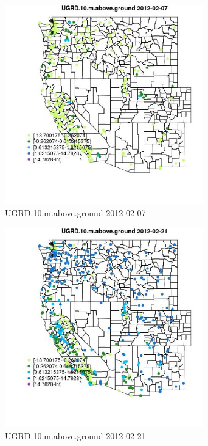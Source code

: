 \begin{figure} 
\centering  
\includegraphics[width=0.77\textwidth]{Code_Outputs/Report_ML_input_PM25_Step4_part_f_de_duplicated_aveswNAs_MapObsUGRD10maboveground2012-02-07.jpg} 
\caption{\label{fig:Report_ML_input_PM25_Step4_part_f_de_duplicated_aveswNAsMapObsUGRD10maboveground2012-02-07}UGRD.10.m.above.ground 2012-02-07} 
\end{figure} 
 

\begin{figure} 
\centering  
\includegraphics[width=0.77\textwidth]{Code_Outputs/Report_ML_input_PM25_Step4_part_f_de_duplicated_aveswNAs_MapObsUGRD10maboveground2012-02-21.jpg} 
\caption{\label{fig:Report_ML_input_PM25_Step4_part_f_de_duplicated_aveswNAsMapObsUGRD10maboveground2012-02-21}UGRD.10.m.above.ground 2012-02-21} 
\end{figure} 
 

